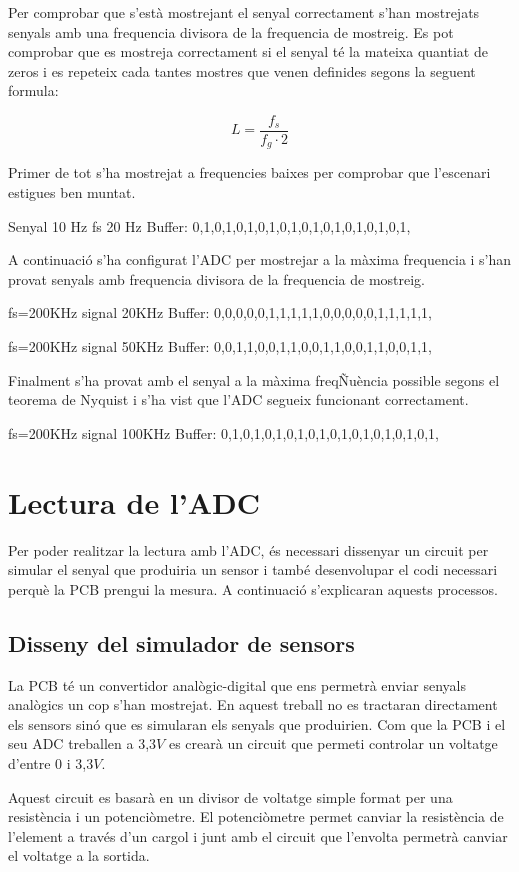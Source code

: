 Per comprobar que s'està mostrejant el senyal correctament s'han mostrejats senyals amb una frequencia divisora de la frequencia de mostreig.
Es pot comprobar que es mostreja correctament si el senyal té la mateixa quantiat de zeros i es repeteix cada tantes mostres que venen definides segons la seguent formula:


\begin{equation}
	L=\frac{f_{s}}{f_{g}\cdot2}
\end{equation}

Primer de tot s'ha mostrejat a frequencies baixes per comprobar que l'escenari estigues ben muntat.

Senyal 10 Hz fs 20 Hz
Buffer: 0,1,0,1,0,1,0,1,0,1,0,1,0,1,0,1,0,1,0,1,

A continuació s'ha configurat l'ADC per mostrejar a la màxima frequencia i s'han provat senyals amb frequencia divisora de la frequencia de mostreig.

fs=200KHz signal 20KHz
Buffer: 0,0,0,0,0,1,1,1,1,1,0,0,0,0,0,1,1,1,1,1,

fs=200KHz signal 50KHz
Buffer: 0,0,1,1,0,0,1,1,0,0,1,1,0,0,1,1,0,0,1,1,

Finalment s'ha provat amb el senyal a la màxima freqÑuència possible segons el teorema de Nyquist i s'ha vist que l'ADC segueix funcionant correctament.

fs=200KHz signal 100KHz
Buffer: 0,1,0,1,0,1,0,1,0,1,0,1,0,1,0,1,0,1,0,1,

\section{Lectura de l'ADC}
Per poder realitzar la lectura amb l'ADC, és necessari dissenyar un circuit per simular el senyal que produiria un sensor i també desenvolupar el codi necessari perquè la PCB prengui la mesura.
A continuació s'explicaran aquests processos.

\subsection{Disseny del simulador de sensors}
La PCB té un convertidor analògic-digital que ens permetrà enviar senyals analògics un cop s'han mostrejat.
En aquest treball no es tractaran directament els sensors sinó que es simularan els senyals que produirien.
Com que la PCB i el seu ADC treballen a 3,3$V$ es crearà un circuit que permeti controlar un voltatge d'entre 0 i 3,3$V$.

Aquest circuit es basarà en un divisor de voltatge simple format per una resistència i un potenciòmetre.
El potenciòmetre permet canviar la resistència de l'element a través d'un cargol i junt amb el circuit que l'envolta permetrà canviar el voltatge a la sortida.

